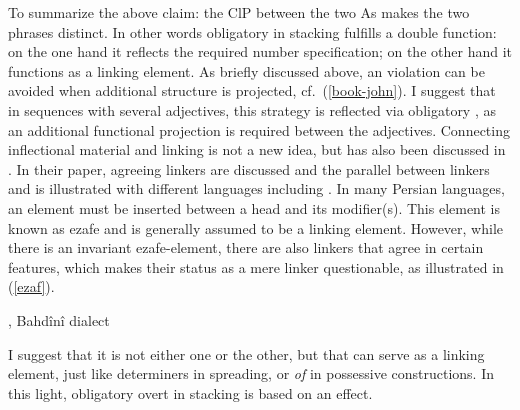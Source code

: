 \documentclass[output=paper,colorlinks,citecolor=brown]{langscibook}
\begin{document}
To summarize the above claim: the ClP between the two As makes the two phrases distinct. In other words obligatory  in stacking fulfills a double function: on the one hand it reflects the required number specification; on the other hand it functions as a linking element. As briefly discussed above, an  violation can be avoided when additional structure is projected, cf.~(\ref{book-john}). I suggest that in sequences with several adjectives, this strategy is reflected via obligatory , as an additional functional projection is required between the adjectives. Connecting inflectional material and linking is not a new idea, but has also been discussed in \citet{franco2015linkers}.  In their paper, agreeing linkers are discussed and the parallel between linkers and  is illustrated with different languages including . In many Persian languages, an element must be inserted between a head and its modifier(s). This element is known as ezafe and is generally assumed to be a linking element. However, while there is an invariant ezafe-element, there are also linkers that agree in certain features, which makes their status as a mere linker questionable, as illustrated in (\ref{ezaf}).

\ea\label{ezaf}, Bahd{\^i}n{\^i} dialect
\z 
\z

I suggest that it is not either one or the other, but that  can serve as a linking element, just like determiners in  spreading, or \textit{of} in  possessive constructions. In this light, obligatory overt  in stacking is based on an  effect.



\z 
\end{document}
